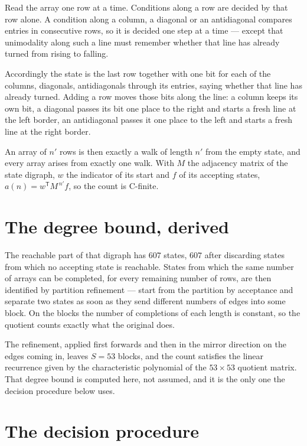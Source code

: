 \documentclass[11pt]{article}
\theoremstyle{definition}
\begin{document}
Read the array one row at a time. Conditions along a row are decided by that row alone. A condition along a column, a diagonal or an antidiagonal compares entries in consecutive rows, so it is decided one step at a time --- except that unimodality along such a line must remember whether that line has already turned from rising to falling.

Accordingly the state is the last row together with one bit for each of the columns, diagonals, antidiagonals through its entries, saying whether that line has already turned. Adding a row moves those bits along the line: a column keeps its own bit, a diagonal passes its bit one place to the right and starts a fresh line at the left border, an antidiagonal passes it one place to the left and starts a fresh line at the right border.

An array of $n'$ rows is then exactly a walk of length $n'$ from the empty state, and every array arises from exactly one walk. With $M$ the adjacency matrix of the state digraph, $w$ the indicator of its start and $f$ of its accepting states, $a(n) = w^{\mathsf T}M^{\,n'}f$, so the count is C-finite.

\section{The degree bound, derived}

The reachable part of that digraph has $607$ states, $607$ after discarding states from which no accepting state is reachable. States from which the same number of arrays can be completed, for every remaining number of rows, are then identified by partition refinement --- start from the partition by acceptance and separate two states as soon as they send different numbers of edges into some block. On the blocks the number of completions of each length is constant, so the quotient counts exactly what the original does.

The refinement, applied first forwards and then in the mirror direction on the edges coming in, leaves $S = 53$ blocks, and the count satisfies the linear recurrence given by the characteristic polynomial of the $53 \times 53$ quotient matrix. That degree bound is computed here, not assumed, and it is the only one the decision procedure below uses.

\section{The decision procedure}
\end{document}
